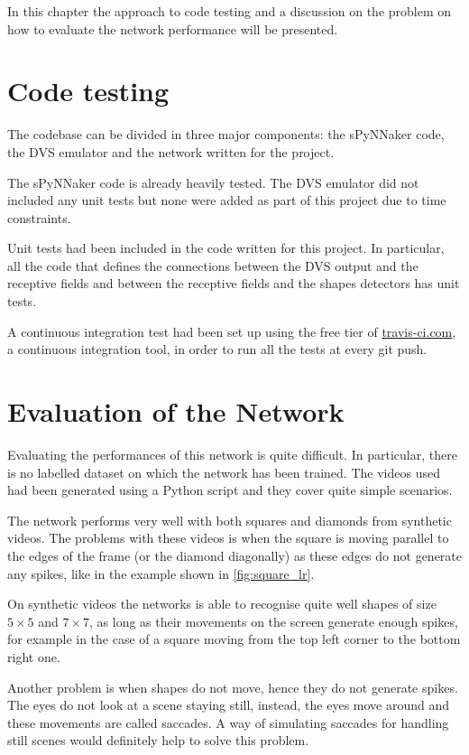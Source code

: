 In this chapter the approach to code testing and a discussion on the problem on how to evaluate the network performance will be presented.


\section{Code testing}
The codebase can be divided in three major components: the sPyNNaker code, the DVS emulator and the network written for the project. 

The sPyNNaker code is already heavily tested. The DVS emulator did not included any unit tests but none were added as part of this project due to time constraints. 

Unit tests had been included in the code written for this project. In particular, all the code that defines the connections between the DVS output and the receptive fields and between the receptive fields and the shapes detectors has unit tests. 

A continuous integration test had been set up using the free tier of \href{http://travis-ci.com}{travis-ci.com}, a continuous integration tool, in order to run all the tests at every git push. 


\section{Evaluation of the Network}
Evaluating the performances of this network is quite difficult. In particular, there is no labelled dataset on which the network has been trained. 
The videos used had been generated using a Python script and they cover quite simple scenarios. 

The network performs very well with both squares and diamonds from synthetic videos. The problems with these videos is when the square is moving parallel to the edges of the frame (or the diamond diagonally) as these edges do not generate any spikes, like in the example shown in \cref{fig:square_lr}. 

On synthetic videos the networks is able to recognise quite well shapes of size $5 \times 5$ and $7 \times 7$, as long as their movements on the screen generate enough spikes, for example in the case of a square moving from the top left corner to the bottom right one. 

Another problem is when shapes do not move, hence they do not generate spikes. The eyes do not look at a scene staying still, instead, the eyes move around and these movements are called saccades. A way of simulating saccades for handling still scenes would definitely help to solve this problem. 

